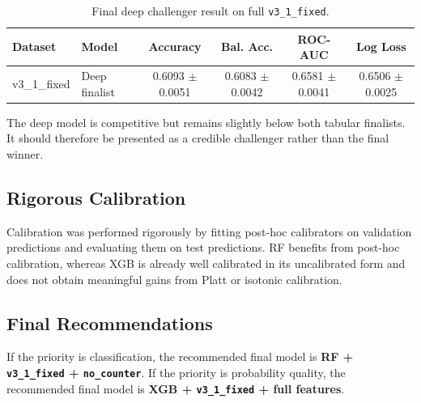 \begin{table}[h]
\centering
\caption{Final deep challenger result on full \texttt{v3\_1\_fixed}.}
\begin{tabular}{l l c c c c}
\hline
Dataset & Model & Accuracy & Bal. Acc. & ROC-AUC & Log Loss \\
\hline
v3\_1\_fixed & Deep finalist & 0.6093 $\pm$ 0.0051 & 0.6083 $\pm$ 0.0042 & 0.6581 $\pm$ 0.0041 & 0.6506 $\pm$ 0.0025 \\
\hline
\end{tabular}
\end{table}

The deep model is competitive but remains slightly below both tabular finalists. It should therefore be presented as a credible challenger rather than the final winner.

\subsection{Rigorous Calibration}
Calibration was performed rigorously by fitting post-hoc calibrators on validation predictions and evaluating them on test predictions. RF benefits from post-hoc calibration, whereas XGB is already well calibrated in its uncalibrated form and does not obtain meaningful gains from Platt or isotonic calibration.

\subsection{Final Recommendations}
If the priority is classification, the recommended final model is \textbf{RF + \texttt{v3\_1\_fixed} + \texttt{no\_counter}}. If the priority is probability quality, the recommended final model is \textbf{XGB + \texttt{v3\_1\_fixed} + full features}.
